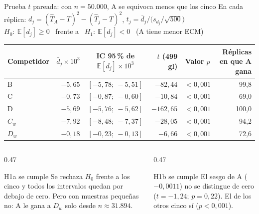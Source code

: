\documentclass[aspectratio=169,11pt]{beamer}
\begin{document}
\begin{frame}{Prueba $t$ pareada: con $n=50{.}000$, A se equivoca menos que los cinco}
  \small
  \centering
  En cada réplica: $d_j=(\hat T_A-T)^2-(\hat T_j-T)^2$, \quad $t_j=\bar d_j\big/\big(s_{d_j}/\sqrt{500}\big)$\\[0.1cm]
  $H_0:\ \mathbb{E}[d_j]\ge 0$ \ frente a \ $H_1:\ \mathbb{E}[d_j]<0$ \ (A tiene menor ECM)

  \vspace{0.25cm}
  \footnotesize
  \renewcommand{\arraystretch}{1.1}
  \begin{tabular}{@{}lrcrcr@{}}
    \toprule
    Competidor & $\bar d_j\times 10^3$ & IC 95\,\% de $\mathbb{E}[d_j]\times 10^3$ & $t$ (499 gl) & Valor $p$ & Réplicas en que A gana \\
    \midrule
    B     & $-5{,}65$ & $[-5{,}78;\ -5{,}51]$ & $-82{,}44$  & $<0{,}001$ & 99,8 \\
    C     & $-0{,}73$ & $[-0{,}87;\ -0{,}60]$ & $-10{,}84$  & $<0{,}001$ & 69,0 \\
    D     & $-5{,}69$ & $[-5{,}76;\ -5{,}62]$ & $-162{,}65$ & $<0{,}001$ & 100,0 \\
    $C_w$ & $-7{,}92$ & $[-8{,}48;\ -7{,}37]$ & $-28{,}05$  & $<0{,}001$ & 94,2 \\
    $D_w$ & $-0{,}18$ & $[-0{,}23;\ -0{,}13]$ & $-6{,}66$   & $<0{,}001$ & 72,6 \\
    \bottomrule
  \end{tabular}

  \vspace{0.25cm}
  \begin{columns}[T]
    \begin{column}{0.47\textwidth}
      \begin{block}{H1a se cumple}
        \footnotesize Se rechaza $H_0$ frente a los cinco y todos los intervalos quedan por debajo de cero. Pero con muestras pequeñas no: A le gana a $D_w$ solo desde $n\approx 31{.}894$.
      \end{block}
    \end{column}
    \begin{column}{0.47\textwidth}
      \begin{block}{H1b se cumple}
        \footnotesize El sesgo de A ($-0{,}0011$) no se distingue de cero ($t=-1{,}24$; $p=0{,}22$). El de los otros cinco sí ($p<0{,}001$).
      \end{block}
    \end{column}
  \end{columns}
\end{frame}
\end{document}
